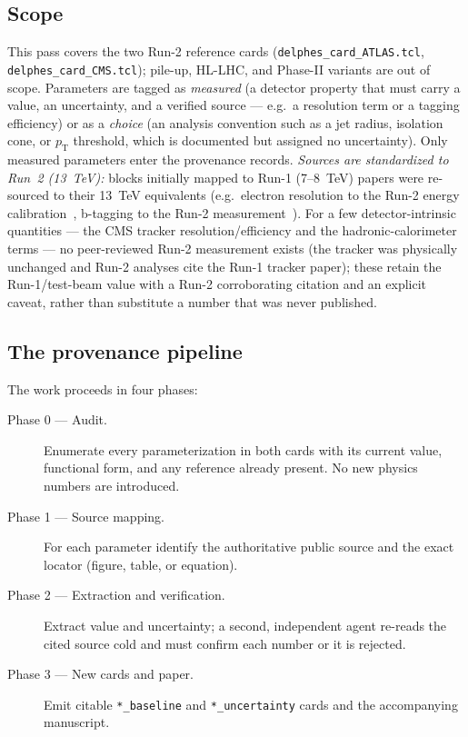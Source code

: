 \documentclass[11pt,a4paper]{article}
\begin{document}
\subsection{Scope}
This pass covers the two Run-2 reference cards
(\texttt{delphes\_card\_ATLAS.tcl}, \texttt{delphes\_card\_CMS.tcl}); pile-up,
HL-LHC, and Phase-II variants are out of scope. Parameters are tagged as
\emph{measured} (a detector property that must carry a value, an uncertainty,
and a verified source --- e.g.\ a resolution term or a tagging efficiency) or as
a \emph{choice} (an analysis convention such as a jet radius, isolation cone, or
$p_\mathrm{T}$ threshold, which is documented but assigned no uncertainty). Only
measured parameters enter the provenance records. \emph{Sources are standardized
to Run~2 (13~TeV):} blocks initially mapped to Run-1 (7--8~TeV) papers were
re-sourced to their 13~TeV equivalents (e.g.\ electron resolution to the Run-2
energy calibration~\cite{atlas-egammacal,cms-egamma}, b-tagging to the Run-2
measurement~\cite{cms-btag}). For a few detector-intrinsic quantities --- the CMS
tracker resolution/efficiency and the hadronic-calorimeter terms --- no
peer-reviewed Run-2 measurement exists (the tracker was physically unchanged and
Run-2 analyses cite the Run-1 tracker paper); these retain the Run-1/test-beam
value with a Run-2 corroborating citation and an explicit caveat, rather than
substitute a number that was never published.

\subsection{The provenance pipeline}
The work proceeds in four phases:
\begin{description}
  \item[Phase 0 --- Audit.] Enumerate every parameterization in both cards with
  its current value, functional form, and any reference already present. No new
  physics numbers are introduced.
  \item[Phase 1 --- Source mapping.] For each parameter identify the
  authoritative public source and the exact locator (figure, table, or
  equation).
  \item[Phase 2 --- Extraction and verification.] Extract value and uncertainty;
  a second, independent agent re-reads the cited source cold and must confirm
  each number or it is rejected.
  \item[Phase 3 --- New cards and paper.] Emit citable \texttt{*\_baseline} and
  \texttt{*\_uncertainty} cards and the accompanying manuscript.
\end{description}
\end{document}
